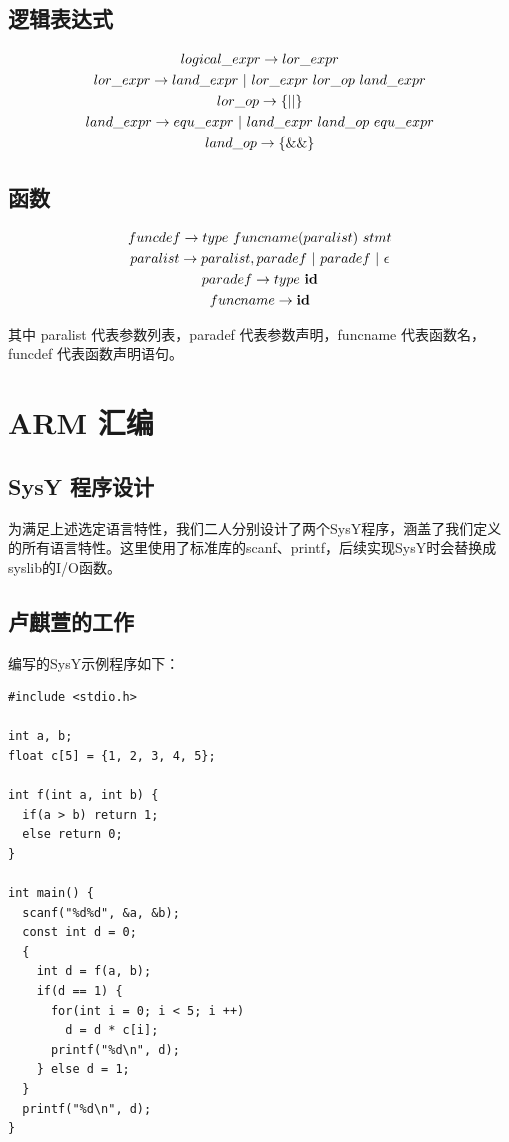\documentclass[UTF8,a4paper,10pt]{ctexart}
\begin{document}
\subsection{逻辑表达式}
\begin{gather*}
  logical\_expr\rightarrow lor\_expr\\
  lor\_expr\rightarrow land\_expr\ |\ lor\_expr\ lor\_op\ land\_expr\\
  lor\_op \rightarrow \rm\bf{\{||\}}\\
  land\_expr\rightarrow equ\_expr\ |\ land\_expr\ land\_op\ equ\_expr\\
  land\_op\rightarrow \rm\bf{\{\&\&\}}\\
\end{gather*}

\subsection{函数}
\begin{gather*}
  funcdef\rightarrow type\ funcname(paralist)\ stmt\\
  paralist\rightarrow paralist,paradef\ |\ paradef\ |\ \epsilon\\
  paradef\rightarrow type\ \rm\bf{id}\\
  funcname \rightarrow \rm\bf{id}
\end{gather*}

其中 paralist 代表参数列表，paradef 代表参数声明，funcname 代表函数名，funcdef 代表函数声明语句。

\section{ARM 汇编}
\subsection{SysY 程序设计}
为满足上述选定语言特性，我们二人分别设计了两个SysY程序，涵盖了我们定义的所有语言特性。这里使用了标准库的scanf、printf，后续实现SysY时会替换成syslib的I/O函数。

\subsection{卢麒萱的工作}

编写的SysY示例程序如下：

\begin{verbatim}
#include <stdio.h>

int a, b;
float c[5] = {1, 2, 3, 4, 5};

int f(int a, int b) {
  if(a > b) return 1;
  else return 0;
}

int main() {
  scanf("%d%d", &a, &b);
  const int d = 0;
  {
    int d = f(a, b);
    if(d == 1) {
      for(int i = 0; i < 5; i ++)
        d = d * c[i];
      printf("%d\n", d);
    } else d = 1;
  }
  printf("%d\n", d);
}
\end{verbatim}
\end{document}
